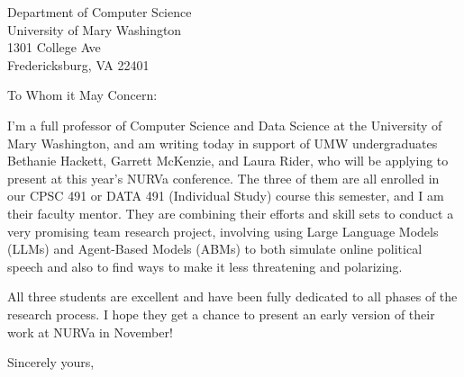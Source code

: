 \documentclass[11pt]{letter}
\begin{document}
\begin{letter}{Department of Computer Science \\ University of Mary Washington \\ 1301 College Ave \\ Fredericksburg, VA  22401}
\opening{To Whom it May Concern:}

I'm a full professor of Computer Science and Data Science at the University of
Mary Washington, and am writing today in support of UMW undergraduates Bethanie
Hackett, Garrett McKenzie, and Laura Rider, who will be applying to present at
this year's NURVa conference. The three of them are all enrolled in our CPSC
491 or DATA 491 (Individual Study) course this semester, and I am their faculty
mentor. They are combining their efforts and skill sets to conduct a very
promising team research project, involving using Large Language Models (LLMs)
and Agent-Based Models (ABMs) to both simulate online political speech and also
to find ways to make it less threatening and polarizing.

All three students are excellent and have been fully dedicated to all phases of the research process. I hope they get a chance to present an early version of their work at NURVa in November!

\closing{Sincerely yours, \\
 \\
}
\end{letter}
\end{document}

